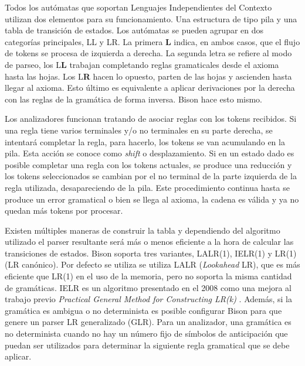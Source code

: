 \label{automatas-pila} Todos los autómatas que soportan Lenguajes Independientes del Contexto utilizan dos elementos para su funcionamiento. Una estructura de tipo pila y una tabla de transición de estados. Los autómatas se pueden agrupar en dos categorías principales, LL y LR. La primera \textbf{L} indica, en ambos casos, que el flujo de tokens se procesa de izquierda a derecha. La segunda letra se refiere al modo de parseo, los L\textbf{L} trabajan completando reglas gramaticales desde el axioma hasta las hojas. Los L\textbf{R} hacen lo opuesto, parten de las hojas y ascienden hasta llegar al axioma. Esto último es equivalente a aplicar derivaciones por la derecha con las reglas de la gramática de forma inversa. Bison hace esto mismo.

Los analizadores funcionan tratando de asociar reglas con los tokens recibidos. Si una regla tiene varios terminales y/o no terminales en su parte derecha, se intentará completar la regla, para hacerlo, los tokens se van acumulando en la pila. Esta acción se conoce como \emph{shift} o desplazamiento. Si en un estado dado es posible completar una regla con los tokens actuales, se produce una reducción y los tokens seleccionados se cambian por el no terminal de la parte izquierda de la regla utilizada, desapareciendo de la pila. Este procedimiento continua hasta se produce un error gramatical o bien se llega al axioma, la cadena es válida y ya no quedan más tokens por procesar.

Existen múltiples maneras de construir la tabla y dependiendo del algoritmo utilizado el parser resultante será más o menos eficiente a la hora de calcular las transiciones de estados. Bison soporta tres variantes, LALR(1), IELR(1) y LR(1) (LR canónico). Por defecto se utiliza se utiliza LALR (\emph{Lookahead} LR), que es más eficiente que LR(1) en el uso de la memoria, pero no soporta la misma cantidad de gramáticas. IELR es un algoritmo presentado en el 2008 \cite{dennyMalloy_paper_IELRAlgorithm} como una mejora al trabajo previo \emph{Practical General Method for Constructing LR(k)} \cite{pager_paper_constructLRparsers}. Además, si la gramática es ambigua o no determinista es posible configurar Bison para que genere un parser LR generalizado (GLR). Para un analizador, una gramática es no determinista cuando no hay un número fijo de símbolos de anticipación que puedan ser utilizados para determinar la siguiente regla gramatical que se debe aplicar.



